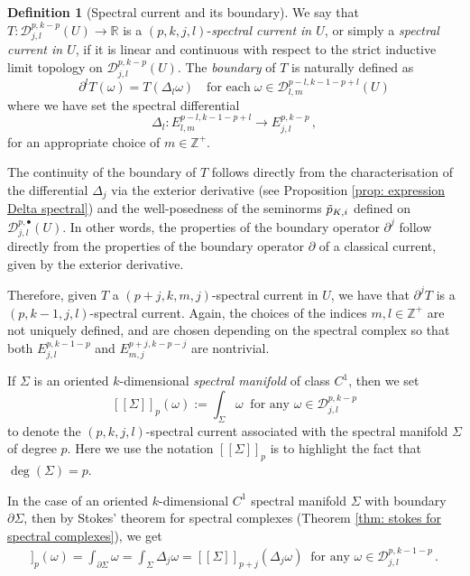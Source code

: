 \documentclass[dvipsnames]{amsart}
\theoremstyle{definition}
\newtheorem{definition}[theorem]{Definition}
\theoremstyle{definition}
\numberwithin{equation}{section}
\newcommand{\R}{\mathbb{R}}
\newcommand{\Z}{\mathbb{Z}}
\begin{document}
\begin{definition}[Spectral current and its boundary]
We say that $T:\mathscr D^{p,k-p}_{j,l}(U)\to\R$ is a $(p,k,j,l)$-{\em spectral current in $U$}, or simply a {\em spectral current in $U$}, if it is linear and continuous with respect to
the strict inductive limit topology on $\mathscr D^{p,k-p}_{j,l}(U)$.
The {\em boundary} of $T$ is naturally defined as 
\[
\partial^l T(\omega)=T(\Delta_l \omega) \quad \text{for each}\; \omega\in\mathscr{ D}^{p-l,k-1-p+l}_{l,m}(U)
\]
where we have set the spectral differential 
\[
\Delta_l\colon E_{l,m}^{p-l,k-1-p+l}\longrightarrow E_{j,l}^{p,k-p}\,,
\]
for an appropriate choice of $m\in\Z^+$.

The continuity of the boundary of $T$ follows directly from the characterisation of the differential $\Delta_j$ via the exterior derivative (see Proposition \ref{prop: expression Delta spectral}) and the well-posedness of the seminorms $\Tilde{p}_{K,i}$ defined on $\mathscr D_{j,l}^{p,\bullet}(U)$. In other words, the properties of the boundary operator $\partial^j$ follow directly from the properties of the boundary operator $\partial$ of a classical current, given by the exterior derivative. 

Therefore, given $T$ a $(p+j,k,m,j)$-spectral current in $U$, we have that $\partial^jT$ is a $(p,k-1,j,l)$-spectral current. Again, the choices of the indices $m,l\in\Z^+$ are not uniquely defined, and are chosen depending on the spectral complex so that both $E_{j,l}^{p,k-1-p}$ and $E_{m,j}^{p+j,k-p-j}$ are nontrivial.


If $\Sigma$ is an oriented $k$-dimensional {\em spectral manifold} of class $C^1$, then we set
\[
[[\Sigma]]_p(\omega):=\int_\Sigma\omega\ \text{ for any }\omega\in\mathscr D_{j,l}^{p,k-p}
\]
to denote the $(p,k,j,l)$-spectral current associated with the spectral manifold $\Sigma$ of degree $p$. Here we use the notation $[[\Sigma]]_p$ is to highlight the fact that $\operatorname{deg}(\Sigma)=p$.

In the case of an oriented $k$-dimensional $C^1$ spectral manifold $\Sigma$ with boundary $\partial\Sigma$, then by Stokes' theorem for spectral complexes (Theorem \ref{thm: stokes for spectral complexes}), we get
\begin{align*}
    [[\partial^j\Sigma]]_p(\omega)=\int_{\partial\Sigma}\omega=\int_\Sigma\Delta_j\omega=[[\Sigma]]_{p+j}(\Delta_j\omega)\ \text{ for any }\omega\in \mathscr D_{j,l}^{p,k-1-p}\,.
\end{align*}
\end{definition}
\end{document}
